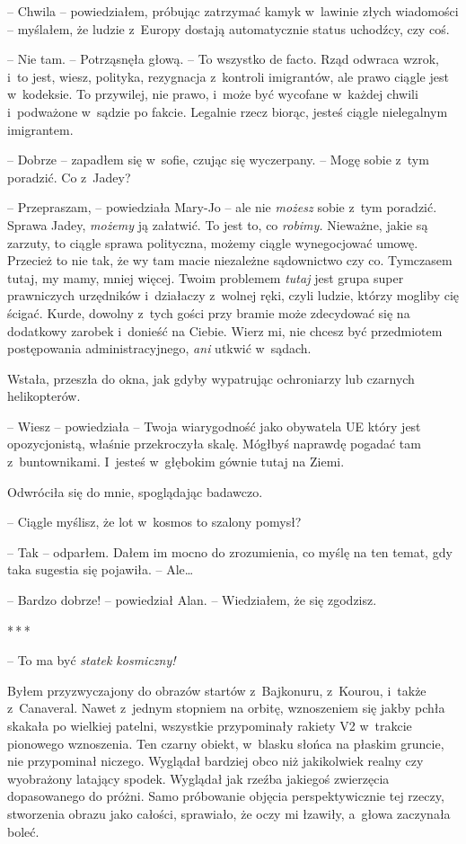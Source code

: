 \documentclass[oneside,polish,12pt,sfheadings]{mwbk}
\newcommand{\threeast}{\bigskip\par\centerline{*\,*\,*}\medskip\par}%
\begin{document}
-- Chwila -- powiedziałem, próbując zatrzymać kamyk w~lawinie złych
wiadomości -- myślałem, że ludzie z~Europy dostają automatycznie status
uchodźcy, czy coś.

-- Nie tam. -- Potrząsnęła głową. -- To wszystko de facto. Rząd odwraca
wzrok, i~to jest, wiesz, polityka, rezygnacja z~kontroli imigrantów, ale
prawo ciągle jest w~kodeksie. To przywilej, nie prawo, i~może być
wycofane w~każdej chwili i~podważone w~sądzie po fakcie. Legalnie rzecz
biorąc, jesteś ciągle nielegalnym imigrantem.

-- Dobrze -- zapadłem się w~sofie, czując się wyczerpany. -- Mogę sobie z~tym poradzić. Co z~Jadey?

-- Przepraszam, -- powiedziała Mary-Jo -- ale nie \emph{możesz} sobie z~tym
poradzić. Sprawa Jadey, \emph{możemy} ją załatwić. To jest to, co
\emph{robimy. } Nieważne, jakie są zarzuty, to ciągle sprawa polityczna,
możemy ciągle wynegocjować umowę. Przecież to nie tak, że wy tam macie
niezależne sądownictwo czy co. Tymczasem tutaj, my mamy, mniej więcej.
Twoim problemem \emph{tutaj} jest grupa super prawniczych urzędników i~działaczy z~wolnej ręki, czyli ludzie, którzy mogliby cię ścigać. Kurde,
dowolny z~tych gości przy bramie może zdecydować się na dodatkowy
zarobek i~donieść na Ciebie. Wierz mi, nie chcesz być przedmiotem
postępowania administracyjnego, \emph{ani} utkwić w~sądach.

Wstała, przeszła do okna, jak gdyby wypatrując ochroniarzy lub czarnych
helikopterów. 

-- Wiesz -- powiedziała -- Twoja wiarygodność jako obywatela
UE który jest opozycjonistą, właśnie przekroczyła skalę. Mógłbyś
naprawdę pogadać tam z~buntownikami. I~jesteś w~głębokim gównie tutaj na
Ziemi.

Odwróciła się do mnie, spoglądając badawczo. 

-- Ciągle myślisz, że lot w~kosmos to szalony pomysł?

-- Tak -- odparłem. Dałem im mocno do zrozumienia, co myślę na ten temat,
gdy taka sugestia się pojawiła. -- Ale\ldots

-- Bardzo dobrze! -- powiedział Alan. -- Wiedziałem, że się zgodzisz.

\threeast

-- To ma być \emph{statek kosmiczny!}

Byłem przyzwyczajony do obrazów startów z~Bajkonuru, z~Kourou, i~także z~Canaveral. Nawet z~jednym stopniem na orbitę, wznoszeniem się jakby
pchła skakała po wielkiej patelni, wszystkie przypominały rakiety V2 w~trakcie pionowego wznoszenia. Ten czarny obiekt, w~blasku słońca na
płaskim gruncie, nie przypominał niczego. Wyglądał bardziej obco niż
jakikolwiek realny czy wyobrażony latający spodek. Wyglądał jak rzeźba
jakiegoś zwierzęcia dopasowanego do próżni. Samo próbowanie objęcia
perspektywicznie tej rzeczy, stworzenia obrazu jako całości, sprawiało,
że oczy mi łzawiły, a~głowa zaczynała boleć.
\end{document}
